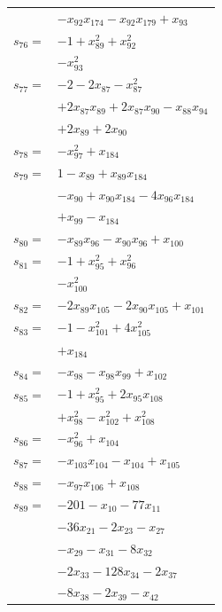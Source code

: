 \begin{longtable}{@{}r@{\;}l@{}}
 & \(\displaystyle -x_{92}x_{174} -x_{92}x_{179} +x_{93}\) \\[3pt]
\(s_{76}=\) & \(\displaystyle -1 +x_{89}^{2} +x_{92}^{2}\) \\
 & \(\displaystyle -x_{93}^{2}\) \\[3pt]
\(s_{77}=\) & \(\displaystyle -2 -2x_{87} -x_{87}^{2}\) \\
 & \(\displaystyle +2x_{87}x_{89} +2x_{87}x_{90} -x_{88}x_{94}\) \\
 & \(\displaystyle +2x_{89} +2x_{90}\) \\[3pt]
\(s_{78}=\) & \(\displaystyle -x_{97}^{2} +x_{184}\) \\[3pt]
\(s_{79}=\) & \(\displaystyle 1 -x_{89} +x_{89}x_{184}\) \\
 & \(\displaystyle -x_{90} +x_{90}x_{184} -4x_{96}x_{184}\) \\
 & \(\displaystyle +x_{99} -x_{184}\) \\[3pt]
\(s_{80}=\) & \(\displaystyle -x_{89}x_{96} -x_{90}x_{96} +x_{100}\) \\[3pt]
\(s_{81}=\) & \(\displaystyle -1 +x_{95}^{2} +x_{96}^{2}\) \\
 & \(\displaystyle -x_{100}^{2}\) \\[3pt]
\(s_{82}=\) & \(\displaystyle -2x_{89}x_{105} -2x_{90}x_{105} +x_{101}\) \\[3pt]
\(s_{83}=\) & \(\displaystyle -1 -x_{101}^{2} +4x_{105}^{2}\) \\
 & \(\displaystyle +x_{184}\) \\[3pt]
\(s_{84}=\) & \(\displaystyle -x_{98} -x_{98}x_{99} +x_{102}\) \\[3pt]
\(s_{85}=\) & \(\displaystyle -1 +x_{95}^{2} +2x_{95}x_{108}\) \\
 & \(\displaystyle +x_{98}^{2} -x_{102}^{2} +x_{108}^{2}\) \\[3pt]
\(s_{86}=\) & \(\displaystyle -x_{96}^{2} +x_{104}\) \\[3pt]
\(s_{87}=\) & \(\displaystyle -x_{103}x_{104} -x_{104} +x_{105}\) \\[3pt]
\(s_{88}=\) & \(\displaystyle -x_{97}x_{106} +x_{108}\) \\[3pt]
\(s_{89}=\) & \(\displaystyle -201 -x_{10} -77x_{11}\) \\
 & \(\displaystyle -36x_{21} -2x_{23} -x_{27}\) \\
 & \(\displaystyle -x_{29} -x_{31} -8x_{32}\) \\
 & \(\displaystyle -2x_{33} -128x_{34} -2x_{37}\) \\
 & \(\displaystyle -8x_{38} -2x_{39} -x_{42}\) \\

\end{longtable}

